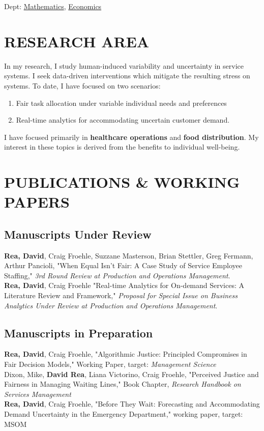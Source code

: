 \documentclass[12pt, letter]{moderncv}
\begin{document}
{\hspace*{.35in} Dept: \href{https://www.wittenberg.edu/academics/math}{Mathematics}, \href{https://www.wittenberg.edu/academics/economics}{Economics}}{}{}{}

\smallskip
\section{RESEARCH AREA}
\smallskip
In my research, I study human-induced variability and uncertainty in service systems. I seek data-driven interventions which mitigate the resulting stress on systems. To date, I have focused on two scenarios:
\smallskip 
\begin{enumerate}[\hspace{0.5cm}(1)]
	\item Fair task allocation under variable individual needs and preferences
	\item Real-time analytics for accommodating uncertain customer demand. 
\end{enumerate}
\smallskip
I have focused primarily in \textbf{healthcare operations} and \textbf{food distribution}. My interest in these topics is derived from the benefits to individual well-being.
\smallskip
\section{PUBLICATIONS \& WORKING PAPERS}
\smallskip
\subsection{Manuscripts Under Review}
\smallskip
\textbf{Rea, David}, Craig Froehle, Suzzane Masterson, Brian Stettler, Greg Fermann, Arthur Pancioli, "When Equal Isn’t Fair:  A Case Study of Service Employee Staffing," \textit{3rd Round Review at Production and Operations Management}.
\smallskip \\
\textbf{Rea, David}, Craig Froehle "Real-time Analytics for On-demand Services: A Literature Review and Framework," \textit{Proposal for Special Issue on Business Analytics Under Review at Production and Operations Management}.

\smallskip
\subsection{Manuscripts in Preparation}
\smallskip 
\textbf{Rea, David}, Craig Froehle, "Algorithmic Justice: Principled Compromises in Fair Decision Models," Working Paper, target: \textit{Management Science}
\smallskip \\
Dixon, Mike, \textbf{David Rea}, Liana Victorino, Craig Froehle, "Perceived Justice and Fairness in Managing Waiting Lines," Book Chapter, \textit{Research Handbook on Services Management}
\smallskip \\
\textbf{Rea, David}, Craig Froehle, "Before They Wait: Forecasting and Accommodating Demand Uncertainty in the Emergency Department," working paper, target: MSOM
\smallskip \\
\end{document}
